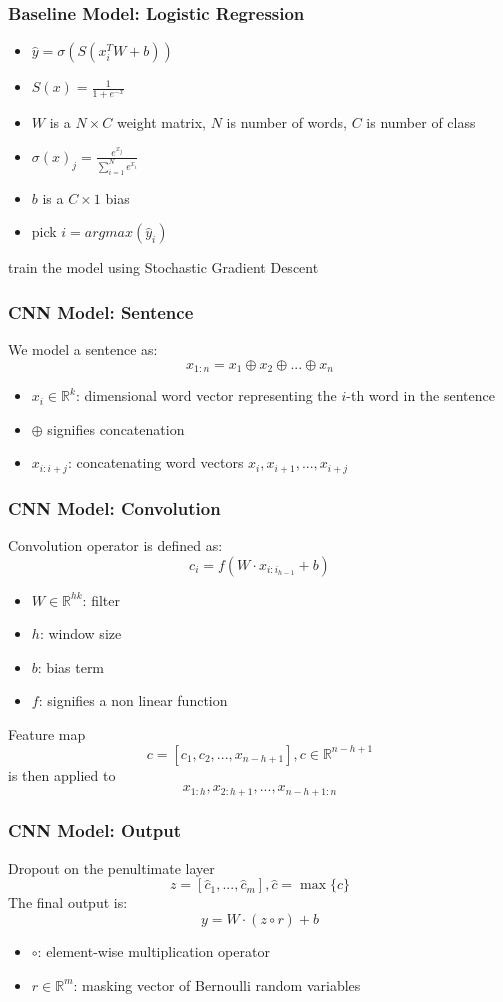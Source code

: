 \documentclass{beamer}
\begin{document}
\begin{frame}
\frametitle{Baseline Model: Logistic Regression}
    \begin{itemize}
    \item $\hat{y} = \sigma(S(x^T_i W +b))$
    \item $S(x) = \frac{1}{1+e^{-x}}$
    \item $W$ is a $N \times C$ weight matrix, 
    $N$ is number of words, $C$ is number of class
    \item $\sigma (x)_{j}={\frac {e^{x_{j}}}{\sum _{i=1}^{N}e^{x_{i}}}}$
    \item $b$ is a $C \times 1$ bias
    \item pick $i=argmax(\hat{y}_i)$
    \end{itemize}
    train the model using
    Stochastic Gradient Descent
\end{frame}

\begin{frame}
\frametitle{CNN Model: Sentence}
    We model a sentence as:
    $$x_{1:n} = x_1 \oplus x_2 \oplus ... \oplus x_n$$
    \begin{itemize}
        \item $x_{i} \in \mathbb{R}^k$: dimensional word vector representing the $i$-th word in the sentence
        \item $\oplus$ signifies concatenation
        \item $x_{i:i+j}$: concatenating word vectors $x_i, x_{i+1}, ... , x_{i+j}$
    \end{itemize}
\end{frame}

\begin{frame}
\frametitle{CNN Model: Convolution}
    Convolution operator is defined as:
    $$c_i = f(W \cdot x_{i:i_{h-1}} + b)$$
    \begin{itemize}
        \item $W \in \mathbb{R}^{hk}$: filter
        \item $h$: window size
        \item $b$: bias term
        \item $f$: signifies a non linear function
    \end{itemize}
    Feature map
    $$c = [c_1, c_2, ... ,x_{n-h+1}], c \in \mathbb{R}^{n-h+1}$$
    is then applied to 
    $$x_{1:h}, x_{2:h+1}, ... ,x_{n-h+1:n}$$
\end{frame}

\begin{frame}
\frametitle{CNN Model: Output}
    Dropout on the penultimate layer 
    $$z = [\hat{c}_1,...,\hat{c}_m], \hat{c}=\operatorname{max}\{c\}$$
    The final output is:
    $$y = W \cdot (z \circ r) + b$$
    \begin{itemize}
    \item $\circ$: element-wise multiplication operator
    \item $r \in \mathbb{R}^m$: masking vector of Bernoulli random variables
    \end{itemize}
\end{frame}
\end{document}
